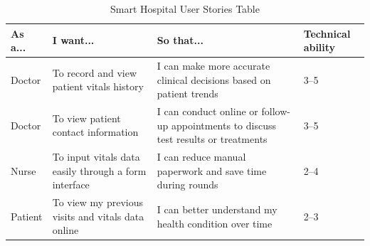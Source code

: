 \vspace{1em}
\begin{table}[H]
\centering
\renewcommand{\arraystretch}{1.4}
\begin{tabular}{|p{2cm}|p{5.2cm}|p{5.2cm}|p{2cm}|}
\hline
\textbf{As a...} & \textbf{I want...} & \textbf{So that...} & \textbf{Technical ability} \\
\hline
Doctor & To record and view patient vitals history & I can make more accurate clinical decisions based on patient trends & 3--5 \\
\hline
Doctor & To view patient contact information & I can conduct online or follow-up appointments to discuss test results or treatments & 3--5 \\
\hline
Nurse & To input vitals data easily through a form interface & I can reduce manual paperwork and save time during rounds & 2--4 \\
\hline
Patient & To view my previous visits and vitals data online & I can better understand my health condition over time & 2--3 \\
\hline
\end{tabular}
\caption{Smart Hospital User Stories Table} %
\label{tab:user-stories}%
\end{table}

\vspace{1em}

